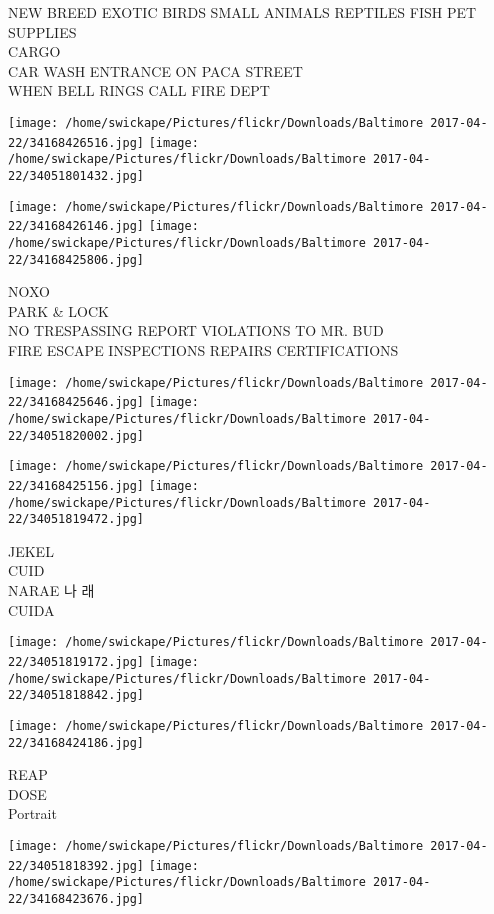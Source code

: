 \documentclass[10pt,letterpaper]{article}
\begin{document}
NEW BREED EXOTIC BIRDS SMALL ANIMALS REPTILES FISH PET SUPPLIES\\
CARGO\\
CAR WASH ENTRANCE ON PACA STREET\\
WHEN BELL RINGS CALL FIRE DEPT
\pagebreak

\texttt{[image: /home/swickape/Pictures/flickr/Downloads/Baltimore 2017-04-22/34168426516.jpg]}
\texttt{[image: /home/swickape/Pictures/flickr/Downloads/Baltimore 2017-04-22/34051801432.jpg]}

\texttt{[image: /home/swickape/Pictures/flickr/Downloads/Baltimore 2017-04-22/34168426146.jpg]}
\texttt{[image: /home/swickape/Pictures/flickr/Downloads/Baltimore 2017-04-22/34168425806.jpg]}

NOXO\\
PARK \& LOCK\\
NO TRESPASSING REPORT VIOLATIONS TO MR. BUD\\
FIRE ESCAPE INSPECTIONS REPAIRS CERTIFICATIONS
\pagebreak

\texttt{[image: /home/swickape/Pictures/flickr/Downloads/Baltimore 2017-04-22/34168425646.jpg]}
\texttt{[image: /home/swickape/Pictures/flickr/Downloads/Baltimore 2017-04-22/34051820002.jpg]}

\texttt{[image: /home/swickape/Pictures/flickr/Downloads/Baltimore 2017-04-22/34168425156.jpg]}
\texttt{[image: /home/swickape/Pictures/flickr/Downloads/Baltimore 2017-04-22/34051819472.jpg]}

JEKEL\\
CUID\\
NARAE 나 래\\
CUIDA
\pagebreak

\texttt{[image: /home/swickape/Pictures/flickr/Downloads/Baltimore 2017-04-22/34051819172.jpg]}
\texttt{[image: /home/swickape/Pictures/flickr/Downloads/Baltimore 2017-04-22/34051818842.jpg]}

\vspace{0.25in}
\texttt{[image: /home/swickape/Pictures/flickr/Downloads/Baltimore 2017-04-22/34168424186.jpg]}

REAP\\
DOSE\\
Portrait
\pagebreak

\texttt{[image: /home/swickape/Pictures/flickr/Downloads/Baltimore 2017-04-22/34051818392.jpg]}
\texttt{[image: /home/swickape/Pictures/flickr/Downloads/Baltimore 2017-04-22/34168423676.jpg]}
\end{document}
